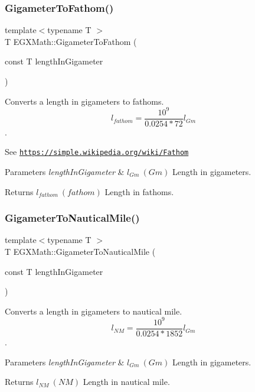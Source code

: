 \subsubsection{\texorpdfstring{Gigameter\+To\+Fathom()}{GigameterToFathom()}}
{\footnotesize\ttfamily template$<$typename T $>$ \\
T E\+G\+X\+Math\+::\+Gigameter\+To\+Fathom (\begin{DoxyParamCaption}\item[{const T}]{length\+In\+Gigameter }\end{DoxyParamCaption})}



Converts a length in gigameters to fathoms. \[ l_{fathom}= \frac{10^{9}}{0.0254 * 72} l_{Gm} \]. 

See \href{https://simple.wikipedia.org/wiki/Fathom}{\tt https\+://simple.\+wikipedia.\+org/wiki/\+Fathom} 
\begin{DoxyParams}{Parameters}
{\em length\+In\+Gigameter} & $ l_{Gm}\ (Gm)$ Length in gigameters. \\
\hline
\end{DoxyParams}
\begin{DoxyReturn}{Returns}
$ l_{fathom}\ (fathom)$ Length in fathoms. 
\end{DoxyReturn}
\mbox{\label{group___e_g_x_math-_conversions-_length_conversions-_s_i-_gigameter-_nautical_ga52d7a5290f284cdfec247ba606967867}} 
\subsubsection{\texorpdfstring{Gigameter\+To\+Nautical\+Mile()}{GigameterToNauticalMile()}}
{\footnotesize\ttfamily template$<$typename T $>$ \\
T E\+G\+X\+Math\+::\+Gigameter\+To\+Nautical\+Mile (\begin{DoxyParamCaption}\item[{const T}]{length\+In\+Gigameter }\end{DoxyParamCaption})}



Converts a length in gigameters to nautical mile. \[ l_{NM}= \frac{10^{9}}{0.0254 * 1852} l_{Gm} \]. 


\begin{DoxyParams}{Parameters}
{\em length\+In\+Gigameter} & $ l_{Gm}\ (Gm)$ Length in gigameters. \\
\hline
\end{DoxyParams}
\begin{DoxyReturn}{Returns}
$ l_{NM}\ (NM)$ Length in nautical mile. 
\end{DoxyReturn}
